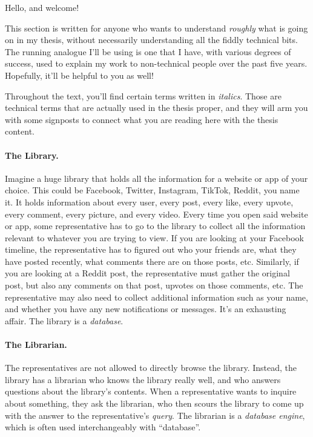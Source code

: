 Hello, and welcome!

This section is written for anyone who wants to understand \emph{roughly} what
is going on in my thesis, without necessarily understanding all the fiddly
technical bits. The running analogue I'll be using is one that I have, with
various degrees of success, used to explain my work to non-technical people over
the past five years. Hopefully, it'll be helpful to you as well!

Throughout the text, you'll find certain terms written in \textit{italics}.
Those are technical terms that are actually used in the thesis proper, and they
will arm you with some signposts to connect what you are reading here with the
thesis content.

\paragraph{The Library.}
%
Imagine a huge library that holds all the information for a website or app of
your choice. This could be Facebook, Twitter, Instagram, TikTok, Reddit, you
name it. It holds information about every user, every post, every like, every
upvote, every comment, every picture, and every video. Every time you open said
website or app, some representative has to go to the library to collect all the
information relevant to whatever you are trying to view. If you are looking at
your Facebook timeline, the representative has to figured out who your friends
are, what they have posted recently, what comments there are on those posts,
etc. Similarly, if you are looking at a Reddit post, the representative must
gather the original post, but also any comments on that post, upvotes on those
comments, etc. The representative may also need to collect additional
information such as your name, and whether you have any new notifications or
messages. It's an exhausting affair. The library is a \textit{database}.

\paragraph{The Librarian.}
%
The representatives are not allowed to directly browse the library. Instead, the
library has a librarian who knows the library really well, and who answers
questions about the library's contents. When a representative wants to inquire
about something, they ask the librarian, who then scours the library to come up
with the answer to the representative's \textit{query}. The librarian is a
\textit{database engine}, which is often used interchangeably with ``database''.

